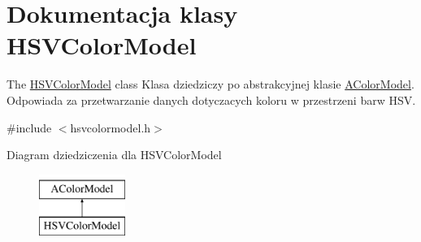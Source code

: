 \hypertarget{class_h_s_v_color_model}{}\section{Dokumentacja klasy H\+S\+V\+Color\+Model}
\label{class_h_s_v_color_model}


The \mbox{\hyperlink{class_h_s_v_color_model}{H\+S\+V\+Color\+Model}} class Klasa dziedziczy po abstrakcyjnej klasie \mbox{\hyperlink{class_a_color_model}{A\+Color\+Model}}. Odpowiada za przetwarzanie danych dotyczacych koloru w przestrzeni barw H\+SV.  




{\ttfamily \#include $<$hsvcolormodel.\+h$>$}

Diagram dziedziczenia dla H\+S\+V\+Color\+Model\begin{figure}[H]
\begin{center}
\leavevmode
\includegraphics[height=2.000000cm]{class_h_s_v_color_model}
\end{center}
\end{figure}
